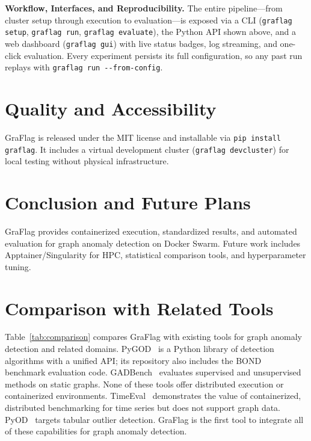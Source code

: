 \documentclass[twoside,11pt]{article}
\begin{document}
\textbf{Workflow, Interfaces, and Reproducibility.} The entire pipeline---from cluster setup through execution to evaluation---is exposed via a CLI (\texttt{graflag setup}, \texttt{graflag run}, \texttt{graflag evaluate}), the Python API shown above, and a web dashboard (\texttt{graflag gui}) with live status badges, log streaming, and one-click evaluation. Every experiment persists its full configuration, so any past run replays with \texttt{graflag run -{}-from-config}.

\section{Quality and Accessibility}

GraFlag is released under the MIT license and installable via \texttt{pip install graflag}. It includes a virtual development cluster (\texttt{graflag devcluster}) for local testing without physical infrastructure.

\section{Conclusion and Future Plans}
\vspace{-2pt}
GraFlag provides containerized execution, standardized results, and automated evaluation for graph anomaly detection on Docker Swarm. Future work includes Apptainer/Singularity for HPC, statistical comparison tools, and hyperparameter tuning.
\vspace{-4pt}

\vskip 0.2in



\newpage
\appendix

\section{Comparison with Related Tools}
\label{app:comparison}

Table~\ref{tab:comparison} compares GraFlag with existing tools for graph anomaly detection and related domains. PyGOD~\citep{liu2024pygod} is a Python library of detection algorithms with a unified API; its repository also includes the BOND~\citep{liu2022bond} benchmark evaluation code. GADBench~\citep{tang2023gadbench} evaluates supervised and unsupervised methods on static graphs. None of these tools offer distributed execution or containerized environments. TimeEval~\citep{wenig2022timeeval} demonstrates the value of containerized, distributed benchmarking for time series but does not support graph data. PyOD~\citep{zhao2019pyod} targets tabular outlier detection. GraFlag is the first tool to integrate all of these capabilities for graph anomaly detection.
\end{document}
